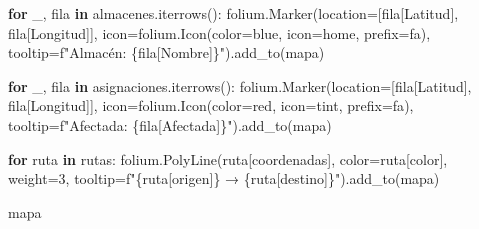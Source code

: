 \documentclass[
  spanish,
  us-letterpaper,
  DIV=11,
  numbers=noendperiod]{scrreprt}
\newenvironment{Shaded}{\begin{snugshade}}{\end{snugshade}}
\newcommand{\ControlFlowTok}[1]{\textcolor[rgb]{0.00,0.23,0.31}{\textbf{#1}}}
\newcommand{\DecValTok}[1]{\textcolor[rgb]{0.68,0.00,0.00}{#1}}
\newcommand{\KeywordTok}[1]{\textcolor[rgb]{0.00,0.23,0.31}{\textbf{#1}}}
\newcommand{\NormalTok}[1]{\textcolor[rgb]{0.00,0.23,0.31}{#1}}
\newcommand{\OperatorTok}[1]{\textcolor[rgb]{0.37,0.37,0.37}{#1}}
\newcommand{\SpecialCharTok}[1]{\textcolor[rgb]{0.37,0.37,0.37}{#1}}
\newcommand{\SpecialStringTok}[1]{\textcolor[rgb]{0.13,0.47,0.30}{#1}}
\newcommand{\StringTok}[1]{\textcolor[rgb]{0.13,0.47,0.30}{#1}}
\numberwithin{equation}{section}
\begin{document}
\begin{Shaded}
\begin{Highlighting}[]
\ControlFlowTok{for}\NormalTok{ \_, fila }\KeywordTok{in}\NormalTok{ almacenes.iterrows():}
\NormalTok{    folium.Marker(location}\OperatorTok{=}\NormalTok{[fila[}\StringTok{\textquotesingle{}Latitud\textquotesingle{}}\NormalTok{],}
\NormalTok{     fila[}\StringTok{\textquotesingle{}Longitud\textquotesingle{}}\NormalTok{]],}
\NormalTok{                  icon}\OperatorTok{=}\NormalTok{folium.Icon(color}\OperatorTok{=}\StringTok{\textquotesingle{}blue\textquotesingle{}}\NormalTok{,}
\NormalTok{                   icon}\OperatorTok{=}\StringTok{\textquotesingle{}home\textquotesingle{}}\NormalTok{, prefix}\OperatorTok{=}\StringTok{\textquotesingle{}fa\textquotesingle{}}\NormalTok{),}
\NormalTok{                  tooltip}\OperatorTok{=}\SpecialStringTok{f"Almacén: }\SpecialCharTok{\{}\NormalTok{fila[}\StringTok{\textquotesingle{}Nombre\textquotesingle{}}\NormalTok{]}\SpecialCharTok{\}}\SpecialStringTok{"}\NormalTok{).add\_to(mapa)}

\ControlFlowTok{for}\NormalTok{ \_, fila }\KeywordTok{in}\NormalTok{ asignaciones.iterrows():}
\NormalTok{    folium.Marker(location}\OperatorTok{=}\NormalTok{[fila[}\StringTok{\textquotesingle{}Latitud\textquotesingle{}}\NormalTok{],}
\NormalTok{     fila[}\StringTok{\textquotesingle{}Longitud\textquotesingle{}}\NormalTok{]],}
\NormalTok{            icon}\OperatorTok{=}\NormalTok{folium.Icon(color}\OperatorTok{=}\StringTok{\textquotesingle{}red\textquotesingle{}}\NormalTok{,}
\NormalTok{                icon}\OperatorTok{=}\StringTok{\textquotesingle{}tint\textquotesingle{}}\NormalTok{, prefix}\OperatorTok{=}\StringTok{\textquotesingle{}fa\textquotesingle{}}\NormalTok{),}
\NormalTok{            tooltip}\OperatorTok{=}\SpecialStringTok{f"Afectada: }\SpecialCharTok{\{}\NormalTok{fila[}\StringTok{\textquotesingle{}Afectada\textquotesingle{}}\NormalTok{]}\SpecialCharTok{\}}\SpecialStringTok{"}\NormalTok{).add\_to(mapa)}

\ControlFlowTok{for}\NormalTok{ ruta }\KeywordTok{in}\NormalTok{ rutas:}
\NormalTok{    folium.PolyLine(ruta[}\StringTok{\textquotesingle{}coordenadas\textquotesingle{}}\NormalTok{], color}\OperatorTok{=}\NormalTok{ruta[}\StringTok{\textquotesingle{}color\textquotesingle{}}\NormalTok{], weight}\OperatorTok{=}\DecValTok{3}\NormalTok{,}
\NormalTok{        tooltip}\OperatorTok{=}\SpecialStringTok{f"}\SpecialCharTok{\{}\NormalTok{ruta[}\StringTok{\textquotesingle{}origen\textquotesingle{}}\NormalTok{]}\SpecialCharTok{\}}\SpecialStringTok{ → }\SpecialCharTok{\{}\NormalTok{ruta[}\StringTok{\textquotesingle{}destino\textquotesingle{}}\NormalTok{]}\SpecialCharTok{\}}\SpecialStringTok{"}\NormalTok{).add\_to(mapa)}

\NormalTok{mapa}
\end{Highlighting}
\end{Shaded}
\end{document}
